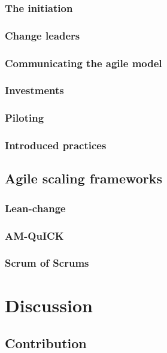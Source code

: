 \documentclass{article}
\begin{document}
\subsubsection{The initiation}

\subsubsection{Change leaders}

\subsubsection{Communicating the agile model}

\subsubsection{Investments}

\subsubsection{Piloting}

\subsubsection{Introduced practices}

\subsection{Agile scaling frameworks}

\subsubsection{Lean-change}

\subsubsection{AM-QuICK}

\subsubsection{Scrum of Scrums}



\section{Discussion}

\subsection{Contribution}

\end{document}
